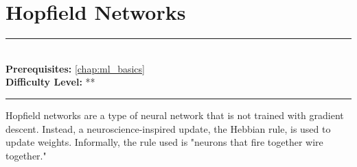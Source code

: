 \documentclass[book.tex]{subfiles}
\begin{document}
\chapter{Hopfield Networks}
\label{chap:behler_parinello}
\noindent\rule{11cm}{0.4pt} \\
\textbf{Prerequisites:} \autoref{chap:ml_basics} \\
\textbf{Difficulty Level:} ** \\
\noindent\rule{11cm}{0.4pt}
\vspace{5mm}

Hopfield networks are a type of neural network that is not trained with gradient descent. Instead, a neuroscience-inspired update, the Hebbian rule, is used to update weights. Informally, the rule used is "neurons that fire together wire together."
\end{document}
